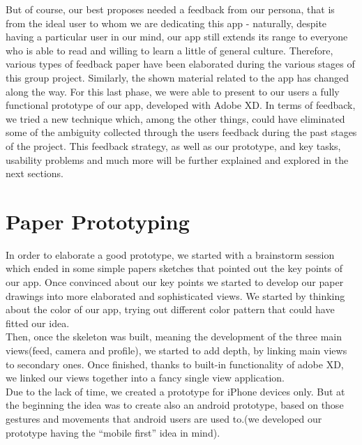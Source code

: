 \documentclass[12pt]{scrartcl}
\begin{document}
	But of course, our best proposes needed a feedback from our persona, that is from the ideal user to whom we are dedicating this app - naturally, despite having a particular user in our mind, our app still extends its range to everyone who is able to read and willing to learn a little of general culture. Therefore, various types of feedback paper have been elaborated during the various stages of this group project. Similarly, the shown material related to the app has changed along the way. For this last phase, we were able to present to our users a fully functional prototype of our app, developed with Adobe XD. In terms of feedback, we tried a new technique which, among the other things, could have eliminated some of the ambiguity collected through the users feedback during the past stages of the project. This feedback strategy, as well as our prototype, and key tasks, usability problems and much more will be further explained and explored in the next sections. 

	\newpage	
	
\section{Paper Prototyping}

	
	In order to elaborate a good prototype, we started with a brainstorm session which ended in some simple papers sketches that pointed out the key points of our app. Once convinced about our key points we started to develop our paper drawings into more elaborated and sophisticated views. We started by thinking about the color of our app, trying out different color pattern that could have fitted our idea.\\
	
	Then, once the skeleton was built, meaning the development of the three main views(feed, camera and profile), we started to add depth, by linking main views to secondary ones. Once finished, thanks to built-in functionality of adobe XD, we linked our views together into a fancy single view application.\\
	
	Due to the lack of time, we created a prototype for iPhone devices only. But at the beginning the idea was to create also an android prototype, based on those gestures and movements that android users are used to.(we developed our prototype having the “mobile first” idea in mind).
	
\end{document}
